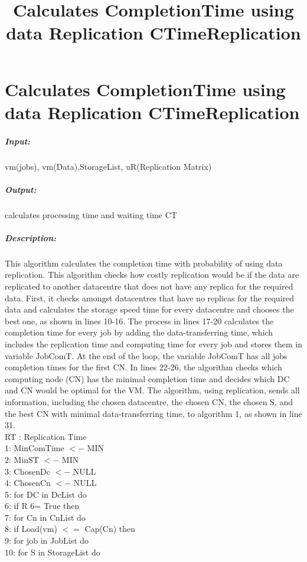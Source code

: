 \documentclass[12pt,a4paper]{report}
\begin{document}
\section{Calculates CompletionTime using data Replication CTimeReplication }
\title{Calculates CompletionTime using data Replication CTimeReplication }
\subparagraph*{Input:} vm(jobs), vm(Data),StorageList, uR(Replication Matrix)
\subparagraph*{Output:} calculates processing time and waiting time CT
\subparagraph*{Description:} This algorithm calculates the completion time with probability of using data replication. This algorithm checks how costly replication would be if the data are replicated to another datacentre that does not have any replica for the required data. First, it checks amongst datacentres that have no replicas for the required data and calculates the storage speed time for every datacentre and chooses the best one, as shown in lines 10-16. The process in lines 17-20 calculates the completion time for every job by adding the data-transferring time, which includes the replication time and computing time for every job and stores them in variable JobComT. At the end of the loop, the variable JobComT has all jobs completion times for the ﬁrst CN. In lines 22-26, the algorithm checks which computing node (CN) has the minimal completion time and decides which DC and CN would be optimal for the VM. The algorithm, using replication, sends all information, including the chosen datacentre, the chosen CN, the chosen S, and the best CN with minimal data-transferring time, to algorithm 1, as shown in line 31.\\
RT : Replication Time\\
1: MinComTime $<-$ MIN \\
2: MinST $<-$ MIN \\
3: ChosenDc $<-$ NULL\\
4: ChosenCn $<-$ NULL \\
5: for DC in DcList do \\
6: \hspace{0.1 in}if R 6= True then \\
7: \hspace{0.2 in}for Cn in CnList do \\
8: \hspace{0.3 in}if Load(vm) $<=$ Cap(Cn) then \\
9: \hspace{0.4 in}for job in JobList do \\
10:\hspace{0.5 in} for S in StorageList do \\
\end{document}
